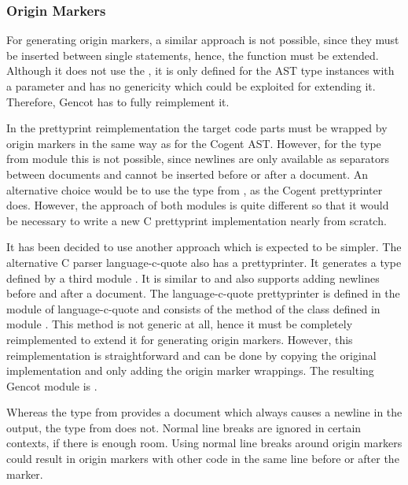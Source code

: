 \subsubsection{Origin Markers}

For generating origin markers, a similar approach is not possible, since they must be inserted between single statements,
hence, the function  must be extended. Although it does not use the , it is only defined for
the AST type instances with a  parameter and has no genericity which could be exploited for extending it.
Therefore, Gencot has to fully reimplement it. 

In the prettyprint reimplementation the target code parts must be wrapped by origin markers
in the same way as for the Cogent AST. However, for the type  from module  
this is not possible, since newlines are only
available as separators between documents and cannot be inserted before or after a document. An alternative choice
would be to use the type  from , as the Cogent prettyprinter does.
However, the approach of both modules is quite different so that it would be necessary to write a new C 
prettyprint implementation nearly from scratch. 

It has been decided to use another approach which is expected to be simpler. The alternative C parser language-c-quote 
also has a prettyprinter. It generates a type  defined by a third module .
It is similar to  and also supports adding newlines before and after a document.
The language-c-quote prettyprinter is defined in the module  of language-c-quote and consists
of the method  of the class  defined in module .
This method is not generic at all, hence it must be completely reimplemented to extend it for generating origin 
markers. However, this reimplementation is straightforward and can be done by copying the original implementation
and only adding the origin marker wrappings. The resulting Gencot module is .

Whereas the type  from  provides a  document which always
causes a newline in the output, the type  from  does not. Normal line breaks
are ignored in certain contexts, if there is enough room. Using normal line breaks around origin markers could result
in origin markers with other code in the same line before or after the marker.

